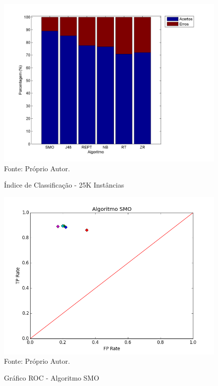 \documentclass[
	12pt,				%
	openright,			%
	oneside,	
	a4paper,				%
	english,				%
	brazil				%
]{abntex2/abntex2} %
\begin{document}
	\pagebreak
	\clearpage
	\newpage
	
	
	\begin{figure}[!htb]
		\caption{\label{figperHits25k} Índice de Classificação - 25K Instâncias}
		\begin{center}
			\includegraphics[scale=0.8]{graphs/perc_hits_25k.png}
			Fonte: Próprio Autor.
		\end{center}
	\end{figure}
	
	\begin{figure}[!htb]
		\caption{\label{figRocSMO} Gráfico ROC - Algoritmo SMO}
		\begin{center}
			\includegraphics[scale=0.8]{python/smo.png}
			Fonte: Próprio Autor.
		\end{center}
	\end{figure}
	
\end{document}
